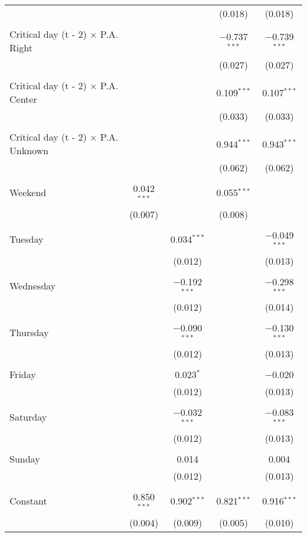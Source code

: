\documentclass[
]{article}
\begin{document}
\begin{table}[!htbp]
{\begin{tabular}{@{\extracolsep{5pt}}lcccc}
  &  &  & (0.018) & (0.018) \\ 
  & & & & \\ 
 Critical day (t - 2) $\times$ P.A. Right &  &  & $-$0.737$^{***}$ & $-$0.739$^{***}$ \\ 
  &  &  & (0.027) & (0.027) \\ 
  & & & & \\ 
 Critical day (t - 2) $\times$ P.A. Center &  &  & 0.109$^{***}$ & 0.107$^{***}$ \\ 
  &  &  & (0.033) & (0.033) \\ 
  & & & & \\ 
 Critical day (t - 2) $\times$ P.A. Unknown &  &  & 0.944$^{***}$ & 0.943$^{***}$ \\ 
  &  &  & (0.062) & (0.062) \\ 
  & & & & \\ 
 Weekend & 0.042$^{***}$ &  & 0.055$^{***}$ &  \\ 
  & (0.007) &  & (0.008) &  \\ 
  & & & & \\ 
 Tuesday &  & 0.034$^{***}$ &  & $-$0.049$^{***}$ \\ 
  &  & (0.012) &  & (0.013) \\ 
  & & & & \\ 
 Wednesday &  & $-$0.192$^{***}$ &  & $-$0.298$^{***}$ \\ 
  &  & (0.012) &  & (0.014) \\ 
  & & & & \\ 
 Thursday &  & $-$0.090$^{***}$ &  & $-$0.130$^{***}$ \\ 
  &  & (0.012) &  & (0.013) \\ 
  & & & & \\ 
 Friday &  & 0.023$^{*}$ &  & $-$0.020 \\ 
  &  & (0.012) &  & (0.013) \\ 
  & & & & \\ 
 Saturday &  & $-$0.032$^{***}$ &  & $-$0.083$^{***}$ \\ 
  &  & (0.012) &  & (0.013) \\ 
  & & & & \\ 
 Sunday &  & 0.014 &  & 0.004 \\ 
  &  & (0.012) &  & (0.013) \\ 
  & & & & \\ 
 Constant & 0.850$^{***}$ & 0.902$^{***}$ & 0.821$^{***}$ & 0.916$^{***}$ \\ 
  & (0.004) & (0.009) & (0.005) & (0.010) \\ 

\end{tabular}}
\end{table}
\end{document}
